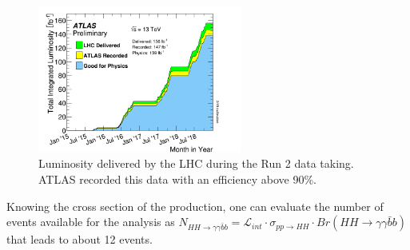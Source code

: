 \begin{figure}[ht]
    \centering
    \includegraphics[width=0.6\textwidth]{Ch2/Img/Lumi.png}
    \caption{Luminosity delivered by the LHC during the Run 2 data taking. ATLAS recorded this data with an efficiency above 90\%.}
    \label{fig:chap2:LHC:Lumi}
\end{figure}
Knowing the cross section of the \HHyybb production, one can evaluate the number of events available for the analysis as $N_{HH\rightarrow\gamma\gamma\bar{b}b} = \mathcal{L}_{int}\cdot\sigma_{pp\rightarrow HH}\cdot Br(HH\rightarrow\gamma\gamma\bar{b}b)$ that leads to about 12 events.
